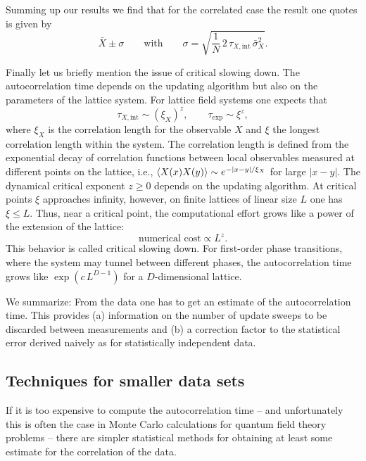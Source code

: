 Summing up our results we find that for the correlated case the result one
quotes is given by
\begin{equation}
  \bar{X} \pm \sigma \qquad \text{with}\qquad
  \sigma = \sqrt{\frac{1}{N}\,2\,\tau_{X,\mathrm{int}}\,\bar{\sigma}_X^2} .
\end{equation}

Finally let us briefly mention the issue of critical slowing down. The autocorrelation time depends on the updating algorithm but also on the parameters of the lattice system. For lattice field systems one expects that
\begin{equation}
  \tau_{X,\mathrm{int}} \sim (\xi_X)^z, \qquad \tau_\mathrm{exp} \sim \xi^z,
\end{equation}
where $\xi_X$ is the correlation length for the observable $X$ and $\xi$ the longest
correlation length within the system. The correlation length is defined from the
exponential decay of correlation functions between local observables measured
at different points on the lattice, i.e., $\left\langle X(x)X(y) \right\rangle \sim e^{-|x-y|/\xi_X}$ for large $|x-y|$.
The dynamical critical exponent $z \geq 0$ depends on the updating algorithm. At
critical points $\xi$ approaches infinity, however, on finite lattices of linear size
$L$ one has $\xi \leq L$. Thus, near a critical point, the computational effort grows
like a power of the extension of the lattice:
\begin{equation}
  \text{numerical cost} \propto L^z .
\end{equation}
This behavior is called critical slowing down. For first-order phase transitions,
where the system may tunnel between different phases, the autocorrelation
time grows like $\exp(c\,L^{D-1})$ for a $D$-dimensional lattice.

We summarize: From the data one has to get an estimate of the autocorrelation time. This provides (a) information on the number of update sweeps
to be discarded between measurements and (b) a correction factor to the
statistical error derived naively as for statistically independent data.

\subsection{Techniques for smaller data sets}

If it is too expensive to compute the autocorrelation time -- and unfortunately
this is often the case in Monte Carlo calculations for quantum field theory
problems -- there are simpler statistical methods for obtaining at least some
estimate for the correlation of the data.

